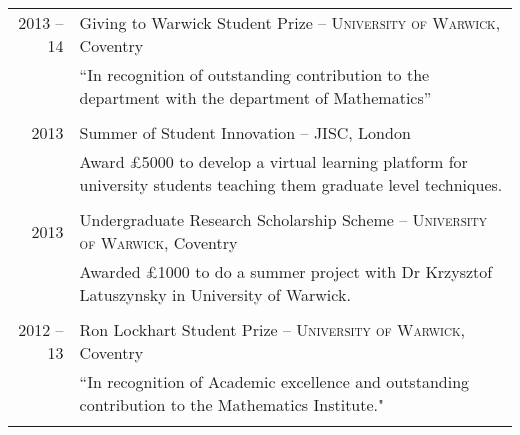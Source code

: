 \documentclass[a4paper,10pt]{article}
\begin{document}
\begin{tabular}{r|p{16cm}}
\textsc{2013 -- 14}& Giving to Warwick Student Prize -- \textsc{University of Warwick}, Coventry\\&\footnotesize{``In recognition of outstanding contribution to the department with the department of Mathematics”}\\\multicolumn{2}{c}{} \\
\textsc{2013}& Summer of Student Innovation -- \textsc{JISC}, London\\&\footnotesize{Award £5000 to develop a virtual learning platform for university students teaching them graduate level techniques.}\\\multicolumn{2}{c}{} \\
\textsc{2013} & Undergraduate Research Scholarship Scheme -- \textsc{University of Warwick}, Coventry\\&\footnotesize{Awarded £1000 to do a summer project with Dr Krzysztof Latuszynsky in University of Warwick.}\\\multicolumn{2}{c}{} \\
\textsc{2012 -- 13}& Ron Lockhart Student Prize -- \textsc{University of Warwick}, Coventry\\&\footnotesize{``In recognition of Academic excellence and outstanding contribution to the Mathematics Institute."}\\\multicolumn{2}{c}{} \\
\end{tabular}

\end{document}
